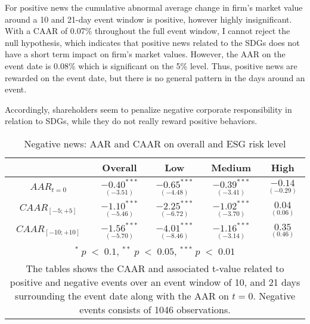 For positive news the cumulative abnormal average change in firm's market value around a 10 and 21-day event window is positive, however highly insignificant. With a CAAR of 0.07\% throughout the full event window, I cannot reject the null hypothesis, which indicates that positive news related to the SDGs does not have a short term impact on firm's market values. However, the AAR on the event date is 0.08\% which is significant on the 5\% level. Thus, positive news are rewarded on the event date, but there is no general pattern in the days around an event.  

Accordingly, shareholders seem to penalize negative corporate responsibility in relation to SDGs, while they do not really reward positive behaviors. 

\begin{table}[H]
\centering
\caption{Negative news: AAR and CAAR on overall and ESG risk level} 
\begin{tabular}{ccccc}
  \hline  \hline
  & \multicolumn{1}{c}{Overall} &  \multicolumn{1}{c}{Low} & \multicolumn{1}{c}{Medium} & \multicolumn{1}{c}{High}\\  
 \hline
$AAR_{t=0}$ &   $\underset{(-3.51)}{-0.40^{***}}$ &   $\underset{(-4.48)}{-0.65^{***}}$ &   $\underset{(-3.41)}{-0.39^{***}}$ &   $\underset{(-0.29)}{-0.14 }$ \\

$CAAR_{[-5;+5]}$  &  $\underset{(-5.46)}{-1.10^{***}}$ &   $\underset{(-6.72)}{-2.25^{***}}$ &   $\underset{(-3.70)}{-1.02^{***}}$ &   $\underset{(0.06)}{0.04}$ \\ 

$CAAR_{[-10;+10]}$    & $\underset{(-5.70)}{-1.56^{***}}$ &   $\underset{(-8.46)}{-4.01^{***}}$ &   $\underset{(-3.14)}{-1.16^{***}}$ &   $\underset{(0.46)}{0.35}$ \\ 
   \hline \hline
   \multicolumn{5}{p{12cm}}{ \footnotesize $^* \; p\; <\; 0.1$, $ ^{**} \; p\; <\; 0.05$, $ ^{***} \; p\; <\; 0.01$  } \\
   \multicolumn{5}{p{13cm}}{\footnotesize The tables shows the CAAR and associated t-value related to positive and negative events over an event window of 10, and 21 days surrounding the event date along with the AAR on $t=0$. Negative events consists of 1046 observations. } \\
   \hline
\end{tabular}
\label{tab: ST_neg_significance}
\end{table}

